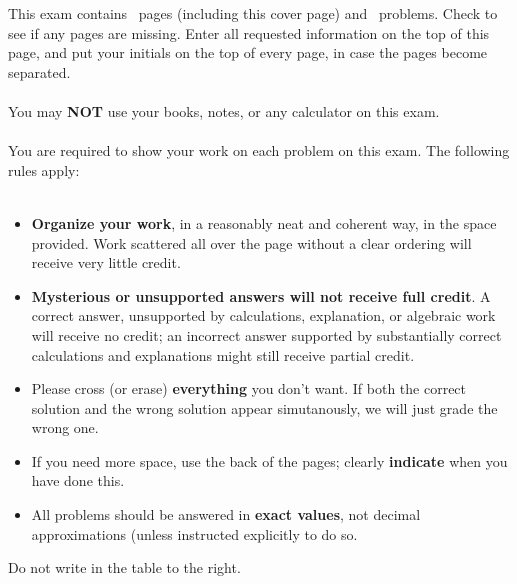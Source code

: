 \documentclass[11pt]{exam}%
\begin{document}
This exam contains \numpages\ pages (including this cover page) and \numquestions\ problems.  Check to see if any pages are missing.  Enter all requested information on the top of this page, and put your initials on the top of every page, in case the pages become separated.\\
\\
You may \textbf{NOT} use your books, notes, or any calculator on this exam.\\
\\
You are required to show your work on each problem on this exam.  The following rules apply:\\
\\
%
\begin{minipage}[t]{3.7in}%
\vspace{0pt}%
\begin{itemize}%
\item%

\textbf{Organize your work}, in a reasonably neat and coherent way, in the space provided. Work scattered all over the page without a clear ordering will receive very little credit.
%
\item%

\textbf{Mysterious or unsupported answers will not receive full credit}. A correct answer, unsupported by calculations, explanation, or algebraic work will receive no credit; an incorrect answer supported by substantially correct calculations and explanations might still receive partial credit.
%
\item%

Please cross (or erase) \textbf{everything} you don't want. If both the correct solution and the wrong solution appear simutanously, we will just grade the wrong one.
%
\item%

If you need more space, use the back of the pages; clearly \textbf{indicate} when you have done this.
%
\item%

All problems should be answered in \textbf{exact values}, not decimal approximations (unless instructed explicitly to do so.%
\end{itemize}%
Do not write in the table to the right.%
\end{minipage}%
\hfill%
\begin{minipage}[t]{2.3in}%
\vspace{0pt}%
%
%
\addpoints%
\gradetable[v]%
\end{minipage}%
\newpage%
\addpoints%
\begin{questions}%
\question%
%
\end{questions}%
\end{document}
